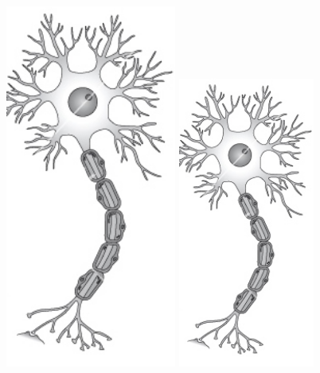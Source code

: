 \documentclass[aspectratio=169]{beamer}
\begin{document}
\begin{frame}
\begin{figure}[ht]
\begin{minipage}[b]{0.23\linewidth}
            \includegraphics[width=0.5\textwidth]{images/InactiveNeuron.jpg}
        \end{minipage}
        \begin{minipage}[b]{0.23\linewidth}
            \includegraphics[width=0.4\textwidth]{images/InactiveNeuron.jpg}
        \end{minipage}
        

\end{figure}
\end{frame}
\end{document}
